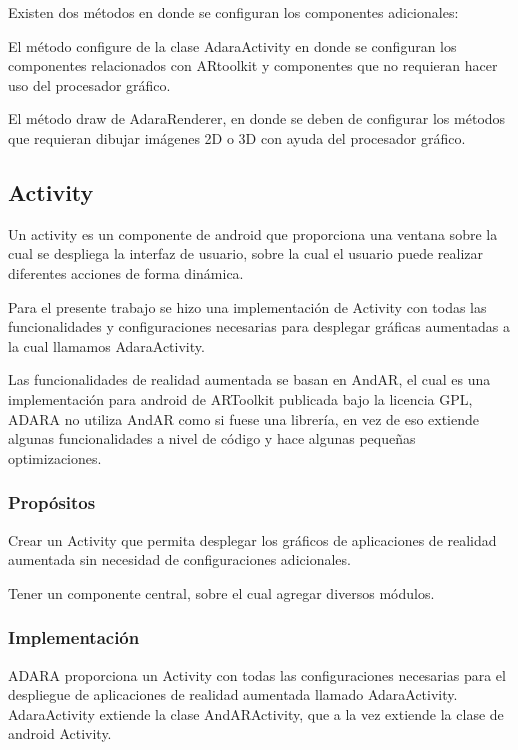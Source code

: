 \documentclass[12pt,a4paper,spanish,openany]{book}
\begin{document}
Existen dos métodos en donde se configuran los componentes adicionales:

El método configure de la clase AdaraActivity en donde se configuran los
componentes relacionados con ARtoolkit y componentes que no requieran hacer uso
del procesador gráfico.

El método draw de AdaraRenderer, en donde se deben de configurar los métodos que
requieran dibujar imágenes 2D o 3D con ayuda del procesador gráfico.


\subsection{Activity}
Un activity es un componente de android que proporciona una ventana sobre la
cual se despliega la interfaz de usuario, sobre la cual el usuario puede
realizar diferentes acciones de forma dinámica.

Para el presente trabajo se hizo una implementación de Activity con todas las
funcionalidades y configuraciones necesarias para desplegar gráficas aumentadas
a la cual llamamos AdaraActivity.

Las funcionalidades de realidad aumentada se basan en AndAR, el cual es una
implementación para android de ARToolkit publicada bajo la licencia GPL, ADARA
no utiliza AndAR como si fuese una librería, en vez de eso extiende
algunas funcionalidades a nivel de código y hace algunas pequeñas
optimizaciones. 

\subsubsection{Propósitos}
Crear un Activity que permita desplegar los gráficos de aplicaciones de realidad
aumentada sin necesidad de configuraciones adicionales.

Tener un componente central, sobre el cual agregar diversos módulos.

\subsubsection{Implementación}

ADARA proporciona un Activity con todas las configuraciones necesarias para el
despliegue de aplicaciones de realidad aumentada llamado AdaraActivity.
AdaraActivity extiende la clase AndARActivity, que a la vez extiende la clase de
android Activity.
\end{document}
